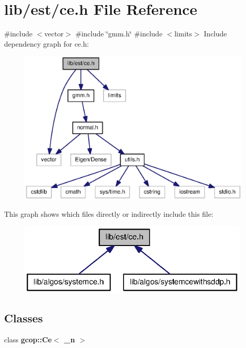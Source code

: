 \section{lib/est/ce.h \-File \-Reference}
\label{ce_8h}
{\ttfamily \#include $<$vector$>$}\*
{\ttfamily \#include \char`\"{}gmm.\-h\char`\"{}}\*
{\ttfamily \#include $<$limits$>$}\*
\-Include dependency graph for ce.\-h\-:\nopagebreak
\begin{figure}[H]
\begin{center}
\leavevmode
\includegraphics[width=350pt]{ce_8h__incl}
\end{center}
\end{figure}
\-This graph shows which files directly or indirectly include this file\-:\nopagebreak
\begin{figure}[H]
\begin{center}
\leavevmode
\includegraphics[width=314pt]{ce_8h__dep__incl}
\end{center}
\end{figure}
\subsection*{\-Classes}
\begin{DoxyCompactItemize}
\item 
class {\bf gcop\-::\-Ce$<$ \-\_\-n $>$}
\end{DoxyCompactItemize}
